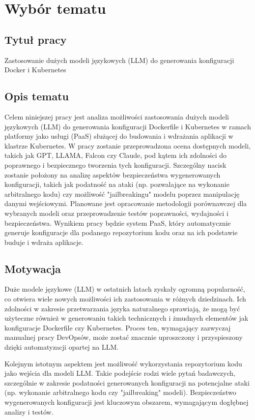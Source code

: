 \clearpage %
\section{Wybór tematu}


\subsection{Tytuł pracy}
Zastosowanie dużych modeli językowych (LLM) do generowania konfiguracji Docker i Kubernetes

\subsection{Opis tematu}
Celem niniejszej pracy jest analiza możliwości zastosowania dużych modeli językowych (LLM) do generowania konfiguracji Dockerfile i Kubernetes w ramach platformy jako usługi (PaaS) służącej do budowania i wdrażania aplikacji w klastrze Kubernetes. W pracy zostanie przeprowadzona ocena dostępnych modeli, takich jak GPT, LLAMA, Falcon czy Claude, pod kątem ich zdolności do poprawnego i bezpiecznego tworzenia tych konfiguracji. Szczególny nacisk zostanie położony na analizę aspektów bezpieczeństwa wygenerowanych konfiguracji, takich jak podatność na ataki (np. pozwalające na wykonanie arbitralnego kodu) czy możliwość "jailbreakingu" modelu poprzez manipulację danymi wejściowymi. Planowane jest opracowanie metodologii porównawczej dla wybranych modeli oraz przeprowadzenie testów poprawności, wydajności i bezpieczeństwa. Wynikiem pracy będzie system PaaS, który automatycznie generuje konfiguracje dla podanego repozytorium kodu oraz na ich podstawie buduje i wdraża aplikacje.

\subsection{Motywacja}
Duże modele językowe (LLM) w ostatnich latach zyskały ogromną popularność, co otwiera wiele nowych możliwości ich zastosowania w różnych dziedzinach. Ich zdolności w zakresie przetwarzania języka naturalnego sprawiają, że mogą być użyteczne również w generowaniu takich technicznych i żmudnych elementów jak konfiguracje Dockerfile czy Kubernetes. Proces ten, wymagający zazwyczaj manualnej pracy DevOpsów, może zostać znacznie uproszczony i przyspieszony dzięki automatyzacji opartej na LLM.

Kolejnym istotnym aspektem jest możliwość wykorzystania repozytorium kodu jako wejścia dla modeli LLM. Takie podejście rodzi wiele pytań badawczych, szczególnie w zakresie podatności generowanych konfiguracji na potencjalne ataki (np. wykonanie arbitralnego kodu czy "jailbreaking" modeli). Bezpieczeństwo wygenerowanych konfiguracji jest kluczowym obszarem, wymagającym dogłębnej analizy i testów.

